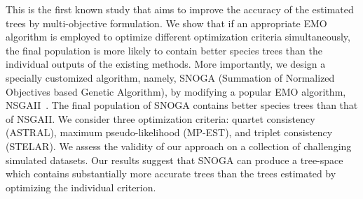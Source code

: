 This is the first known study that aims to improve the accuracy of the estimated trees by multi-objective formulation. We show that if an appropriate EMO algorithm is employed to optimize different optimization criteria simultaneously, the final population is more likely to contain better species trees than the individual outputs of the existing methods.
More importantly, we design a specially customized algorithm, namely, SNOGA (Summation of Normalized Objectives based Genetic Algorithm), by modifying a popular EMO algorithm, NSGAII~\cite{deb2002fast}. The final population of SNOGA contains better species trees than that of NSGAII.  %
We consider three optimization criteria: quartet consistency (ASTRAL), maximum pseudo-likelihood (MP-EST), and triplet consistency (STELAR). We assess the validity of our approach on a collection of challenging simulated datasets. Our results suggest that SNOGA can produce a tree-space which contains substantially more accurate trees than the trees estimated by optimizing the individual criterion. 






